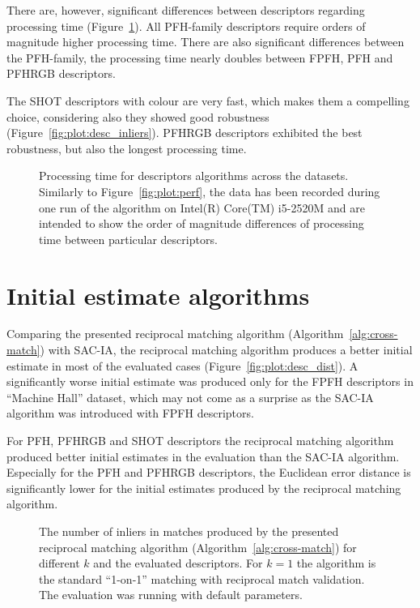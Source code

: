 There are, however, significant differences between descriptors regarding processing time (Figure~\ref{fig:plot:desc_perf}). All \gls{PFH}-family descriptors require orders of magnitude higher processing time. There are also significant differences between the \gls{PFH}-family, the processing time nearly doubles between \gls{FPFH}, \gls{PFH} and \gls{PFHRGB} descriptors.

The \gls{SHOT} descriptors with colour are very fast, which makes them a compelling choice, considering also they showed good robustness (Figure~\ref{fig:plot:desc_inliers}). \gls{PFHRGB} descriptors exhibited the best robustness, but also the longest processing time.

\begin{figure}
  \centering
  
  \caption[Processing time per descriptors]{Processing time for descriptors algorithms across the datasets. Similarly to Figure~\ref{fig:plot:perf}, the data has been recorded during one run of the algorithm on Intel(R) Core(TM) i5-2520M and are intended to show the order of magnitude differences of processing time between particular descriptors.}
  \label{fig:plot:desc_perf}
\end{figure}

\section{Initial estimate algorithms}
\label{sec:initial-estimate-algorithms}

Comparing the presented reciprocal matching algorithm (Algorithm~\ref{alg:cross-match}) with \gls{SAC-IA}, the reciprocal matching algorithm produces a better initial estimate in most of the evaluated cases (Figure~\ref{fig:plot:desc_dist}). A significantly worse initial estimate was produced only for the \gls{FPFH} descriptors in ``Machine Hall'' dataset, which may not come as a surprise as the \gls{SAC-IA} algorithm was introduced with \gls{FPFH} descriptors.

For \gls{PFH}, \gls{PFHRGB} and \gls{SHOT} descriptors the reciprocal matching algorithm produced better initial estimates in the evaluation than the \gls{SAC-IA} algorithm. Especially for the \gls{PFH} and \gls{PFHRGB} descriptors, the Euclidean error distance is significantly lower for the initial estimates produced by the reciprocal matching algorithm.

\begin{figure}
  \centering
  
  \caption[The number of inliers per $k$ in the reciprocal matching algorithm]{The number of inliers in matches produced by the presented reciprocal matching algorithm (Algorithm~\ref{alg:cross-match}) for different $k$ and the evaluated descriptors. For $k=1$ the algorithm is the standard ``1-on-1'' matching with reciprocal match validation. The evaluation was running with default parameters.}
  \label{fig:plot:matching_k_inliers}
\end{figure}

